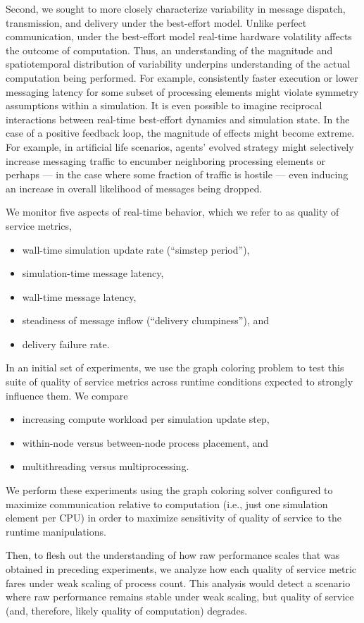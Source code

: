 Second, we sought to more closely characterize variability in message dispatch, transmission, and delivery under the best-effort model.
Unlike perfect communication, under the best-effort model real-time hardware volatility affects the outcome of computation.
Thus, an understanding of the magnitude and spatiotemporal distribution of variability underpins understanding of the actual computation being performed.
For example, consistently faster execution or lower messaging latency for some subset of processing elements might violate symmetry assumptions within a simulation.
It is even possible to imagine reciprocal interactions between real-time best-effort dynamics and simulation state.
In the case of a positive feedback loop, the magnitude of effects might become extreme.
For example, in artificial life scenarios, agents' evolved strategy might selectively increase messaging traffic to encumber neighboring processing elements or perhaps --- in the case where some fraction of traffic is hostile --- even inducing an increase in overall likelihood of messages being dropped.

We monitor five aspects of real-time behavior, which we refer to as quality of service metrics,
\begin{itemize}
  \item wall-time simulation update rate (``simstep period''),
  \item simulation-time message latency,
  \item wall-time message latency,
  \item steadiness of message inflow (``delivery clumpiness''), and
  \item delivery failure rate.
\end{itemize}

In an initial set of experiments, we use the graph coloring problem to test this suite of quality of service metrics across runtime conditions expected to strongly influence them.
We compare
\begin{itemize}
  \item increasing compute workload per simulation update step,
  \item within-node versus between-node process placement, and
  \item multithreading versus multiprocessing.
\end{itemize}
We perform these experiments using the graph coloring solver configured to maximize communication relative to computation (i.e., just one simulation element per CPU) in order to maximize sensitivity of quality of service to the runtime manipulations.

Then, to flesh out the understanding of how raw performance scales that was obtained in preceding experiments, we analyze how each quality of service metric fares under weak scaling of process count.
This analysis would detect a scenario where raw performance remains stable under weak scaling, but quality of service (and, therefore, likely quality of computation) degrades.
